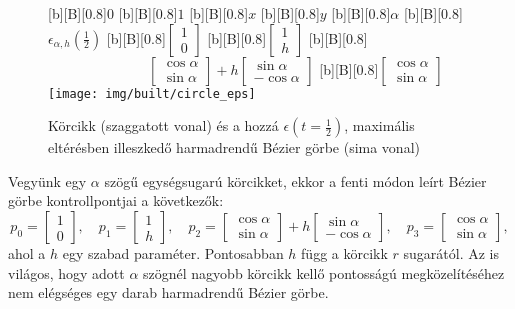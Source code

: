 \documentclass[12pt]{report}
\theoremstyle{definition}
\begin{document}
  \begin{figure}
  [b][B][0.8]{\bf{$0$}}
  [b][B][0.8]{\bf{$1$}}
  [b][B][0.8]{\bf{$x$}}
  [b][B][0.8]{\bf{$y$}}
  [b][B][0.8]{\bf{$\alpha$}}
  [b][B][0.8]{\bf{$\epsilon_{\alpha,h}(\frac{1}{2})$}\qquad}
  [b][B][0.8]{\bf{$\begin{bmatrix} 1 \\ 0 \end{bmatrix}$}}
  [b][B][0.8]{\bf{$\begin{bmatrix} 1 \\ h \end{bmatrix}$}}
  [b][B][0.8]{\bf{$\hspace{3cm}\begin{bmatrix}\cos\alpha\\ \sin\alpha
                              \end{bmatrix} + h \begin{bmatrix} \sin\alpha \\
                              -\cos\alpha \end{bmatrix}$}}
  [b][B][0.8]{\bf{$\begin{bmatrix}\cos\alpha\\ \sin\alpha
                              \end{bmatrix}$}}
    \centering
    \texttt{[image: img/built/circle\_eps]}
    \caption{\label{fig:circle} Körcikk (szaggatott vonal) és a hozzá
    $\epsilon(t=\frac{1}{2})$, maximális eltérésben illeszkedő harmadrendű
    Bézier görbe (sima vonal)}
  \end{figure}

Vegyünk egy $\alpha$ szögű egységsugarú körcikket, ekkor a fenti módon leírt
Bézier görbe kontrollpontjai a következők:
\[p_0 = \begin{bmatrix} 1 \\ 0 \end{bmatrix},\quad
  p_1 = \begin{bmatrix} 1 \\ h \end{bmatrix},\quad
  p_2 = \begin{bmatrix} \cos\alpha \\ \sin\alpha \end{bmatrix} + h
        \begin{bmatrix} \sin\alpha \\ -\cos\alpha \end{bmatrix},\quad
  p_3 = \begin{bmatrix} \cos\alpha \\ \sin\alpha \end{bmatrix}, \]
ahol a $h$ egy szabad paraméter. Pontosabban $h$ függ a körcikk $r$ sugarától.
Az is világos, hogy adott $\alpha$ szögnél nagyobb körcikk kellő pontosságú
megközelítéséhez nem elégséges egy darab harmadrendű Bézier görbe.
\end{document}
